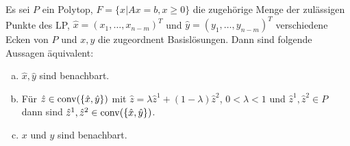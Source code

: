 \begin{theorem}
Es sei $P$ ein Polytop, $F = \{ x | Ax=b, x\geq 0 \}$ die zugehörige Menge der zulässigen Punkte des LP,
$\hat{x} = (x_1, \dotsc, x_{n-m})^T$ und $\hat{y} = (y_1, \dotsc, y_{n-m})^T$ verschiedene Ecken von $P$ und $x,y$ die zugeordnent Basislösungen. Dann sind folgende Aussagen äquivalent:
\begin{enumerate}[(a)]
\item $\hat{x},\hat{y}$ sind benachbart.
\item Für $\hat{z} \in \operatorname{conv}(\{\hat{x},\hat{y}\})$ mit $\hat{z} = \lambda \hat{z}^1 + (1-\lambda) \hat{z}^2$, $0 < \lambda < 1$ und $\hat{z}^1, \hat{z}^2 \in P$ dann sind $\hat{z}^1, \hat{z}^2 \in \operatorname{conv}(\{\hat{x},\hat{y}\})$. \label{th:eq_b}
\item $x$ und $y$ sind benachbart.
\end{enumerate}
\end{theorem}
